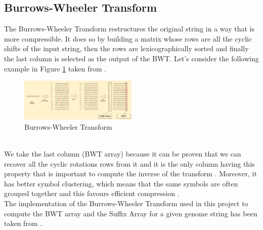 \documentclass[final,5p,times,twocolumn,authoryear]{elsarticle}
\begin{document}
\subsection{Burrows-Wheeler Transform}
The Burrows-Wheeler Transform restructures the original string in a way that is more compressible. It does so by building a matrix whose rows are all the cyclic shifts of the input string, then the rows are lexicographically sorted and finally the last column is selected as the output of the BWT.
Let's consider the following example in Figure \ref{fig:bwt-label} taken from \cite{mreasy}.
\begin{figure}
    \centering
    \includegraphics[width=0.5\textwidth]{images/bwt.png}
    \caption{Burrows-Wheeler Transform}
    \label{fig:bwt-label}
\end{figure}
\\ We take the last column (BWT array) because it can be proven that we can recover all the cyclic rotations rows from it and it is the only column having this property that is important to compute the inverse of the transform \cite{geeks}. Moreover, it has better symbol clustering, which means that the same symbols are often grouped together and this favours efficient compression \cite{geeks}. \\
The implementation\cite{bwt.h me} of the Burrows-Wheeler Transform used in this project to compute the BWT array and the Suffix Array for a given genome string has been taken from \cite{geeks}.
\end{document}
